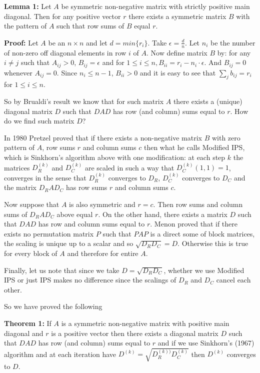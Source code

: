 \documentclass{article}
\begin{document}
  \textbf{Lemma 1:} Let $A$ be symmetric non-negative matrix with strictly positive main diagonal. Then for any positive vector $r$ there exists a symmetric matrix $B$ with the pattern of $A$ such that row sums of $B$ equal $r$.
  
  \textbf{Proof:} Let $A$ be an $n \times n$ and let $d = min\{r_i\}$. Take $\epsilon = \frac{d}{n}$. Let $n_i$ be the number of non-zero off diagonal elements in row $i$ of $A$. Now define matrix $B$ by: for any $i \ne j$ such that $A_{ij} > 0$, $B_{ij} = \epsilon$ and for $1 \le  i \le n, B_{ii} = r_i - n_i \cdot \epsilon$. And $B_{ij} = 0$ whenever $A_{ij} = 0$. Since $n_i \le n-1$, $B_{ii} > 0$ and it is easy to see that $\sum_j {b_{ij}} = r_i$ for $1 \le i \le n$.
  
  So by Brualdi's result we know that for such matrix $A$ there exists a (unique) diagonal matrix $D$ such that $DAD$ has row (and column) sums equal to $r$. How do we find such matrix $D$?
  
  In 1980 Pretzel \cite{pretzel1980} proved that if there exists a non-negative matrix $B$ with zero pattern of $A$, row sums $r$ and column sums $c$ then what he calls Modified IPS, which is Sinkhorn's  algorithm above with one modification: at each step $k$ the matrices $D_R^{(k)}$ and $D_C^{(k)}$ are scaled in such a way that $D_C^{(k)}(1,1) = 1$, converges in the sense that $D_R^{(k)}$ converges to $D_R$, $D_C^{(k)}$ converges to $D_C$ and the matrix $D_RAD_C$ has row sums $r$ and column sums $c$. 
  
  Now suppose that $A$ is also symmetric and $r = c$. Then row sums and column sums of $D_RAD_C$ above equal $r$. On the other hand, there exists a matrix $D$ such that $DAD$ has row and column sums equal to $r$. Menon \cite{menon1968} proved that if there exists no permutation matrix $P$ such that $PAP$ is a direct some of block matrices, the scaling is unique up to a scalar and so $\sqrt{D_RD_C} = D$. Otherwise this is true for every block of $A$ and therefore for entire $A$.
  
  Finally, let us note that since we take $D = \sqrt{D_RD_C}$, whether we use Modified IPS or just IPS makes no difference since the scalings of $D_R$ and $D_C$ cancel each other. 
  
  So we have proved the following
  
  \textbf{Theorem 1:} If $A$ is a symmetric non-negative matrix with positive main diagonal and $r$ is a positive vector then there exists a diagonal matrix $D$ such that $DAD$ has row (and column) sums equal to $r$ and if we use Sinkhorn's (1967) algorithm and at each iteration have $D^{(k)} = \sqrt{D_R^{(k))}D_C^{(k)}}$ then $D^{(k)}$ converges to $D$.
  
\end{document}
